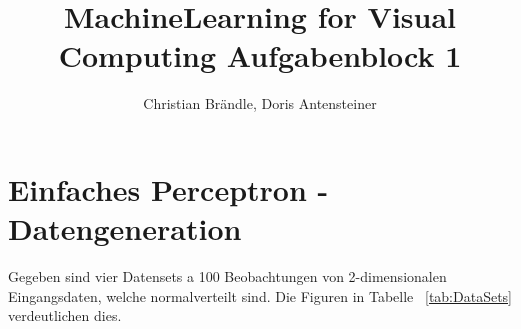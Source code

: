 \documentclass[]{report}
\title{MachineLearning for Visual Computing Aufgabenblock 1}
\author{Christian Br\"andle, Doris Antensteiner}
\begin{document}
\maketitle


\section{Einfaches Perceptron - Datengeneration}


Gegeben sind vier Datensets a 100 Beobachtungen von 2-dimensionalen Eingangsdaten, welche normalverteilt sind. Die Figuren in Tabelle ~\ref{tab:DataSets} verdeutlichen dies.
\end{document}
